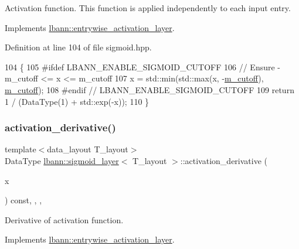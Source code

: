 Activation function. This function is applied independently to each input entry. 

Implements \hyperlink{classlbann_1_1entrywise__activation__layer_a69269401530a2112b66660383464bab9}{lbann\+::entrywise\+\_\+activation\+\_\+layer}.



Definition at line 104 of file sigmoid.\+hpp.


\begin{DoxyCode}
104                                                  \{
105 \textcolor{preprocessor}{  #ifdef LBANN\_ENABLE\_SIGMOID\_CUTOFF}
106     \textcolor{comment}{// Ensure -m\_cutoff <= x <= m\_cutoff}
107     x = std::min(std::max(x, -\hyperlink{classlbann_1_1sigmoid__layer_ab4a50a9ae123aef61ff3f0c9c066bdff}{m\_cutoff}), \hyperlink{classlbann_1_1sigmoid__layer_ab4a50a9ae123aef61ff3f0c9c066bdff}{m\_cutoff});
108 \textcolor{preprocessor}{  #endif // LBANN\_ENABLE\_SIGMOID\_CUTOFF}
109     \textcolor{keywordflow}{return} 1 / (DataType(1) + std::exp(-x));
110   \}
\end{DoxyCode}
\mbox{\label{classlbann_1_1sigmoid__layer_a2736bf99e3304083cd964f6707c2f666}} 
\subsubsection{\texorpdfstring{activation\+\_\+derivative()}{activation\_derivative()}}
{\footnotesize\ttfamily template$<$data\+\_\+layout T\+\_\+layout$>$ \\
Data\+Type \hyperlink{classlbann_1_1sigmoid__layer}{lbann\+::sigmoid\+\_\+layer}$<$ T\+\_\+layout $>$\+::activation\+\_\+derivative (\begin{DoxyParamCaption}\item[{Data\+Type}]{x }\end{DoxyParamCaption}) const\hspace{0.3cm}{\ttfamily [inline]}, {\ttfamily [override]}, {\ttfamily [protected]}, {\ttfamily [virtual]}}

Derivative of activation function. 

Implements \hyperlink{classlbann_1_1entrywise__activation__layer_a7676a4c5060452a38264993554e79f8e}{lbann\+::entrywise\+\_\+activation\+\_\+layer}.



